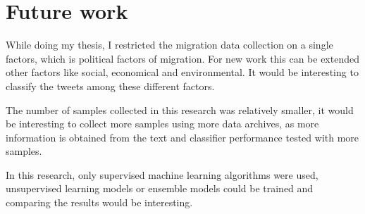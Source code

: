 \section{Future work}

While doing my thesis, I restricted the migration data collection on a single factors, which is political factors of migration. For new work this can be extended other factors like social, economical and environmental. It would be interesting to classify the tweets among these different factors. 

The number of samples collected in this research was relatively smaller, it would be interesting to collect more samples using more data archives, as more information is obtained from the text and classifier performance tested with more samples.

In this research, only supervised machine learning algorithms were used, unsupervised learning models or ensemble models could be trained and comparing the results would be interesting.
